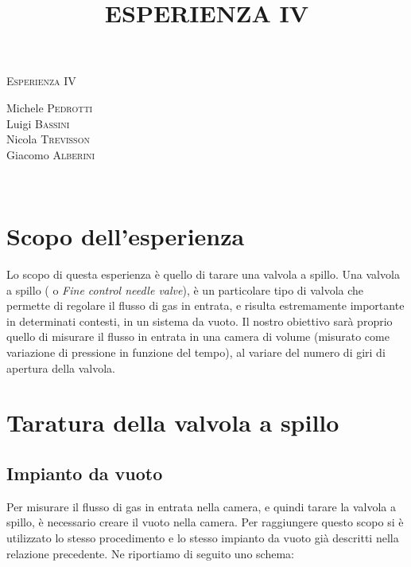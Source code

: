 \documentclass[a4paper,11pt]{article}
\begin{document}
\begin{center}



\textsc{\Huge Esperienza IV}\\[0.5cm]



\large
\title{ESPERIENZA IV}

Michele \textsc{Pedrotti}\\
Luigi \textsc{Bassini}\\
Nicola \textsc{Trevisson}\\
Giacomo \textsc{Alberini}






\end{center}


~\\
\section{Scopo dell'esperienza}
Lo scopo di questa esperienza è quello di tarare una valvola a spillo. Una valvola a spillo ( o \textit{Fine control needle valve}), è un particolare tipo di valvola che permette di regolare il flusso di gas in entrata, e risulta estremamente importante in determinati contesti, in un sistema da vuoto. Il nostro obiettivo sarà proprio quello di misurare il flusso in entrata in una camera di volume (misurato come variazione di pressione in funzione del tempo), al variare del numero di giri di apertura della valvola.


\section{Taratura della valvola a spillo}
\subsection{Impianto da vuoto}
Per misurare il flusso di gas in entrata nella camera, e quindi tarare la valvola a spillo, è necessario creare il vuoto nella camera. Per raggiungere questo scopo si è utilizzato lo stesso procedimento e lo stesso impianto da vuoto già descritti nella relazione precedente. Ne riportiamo di seguito uno schema:
\end{document}
